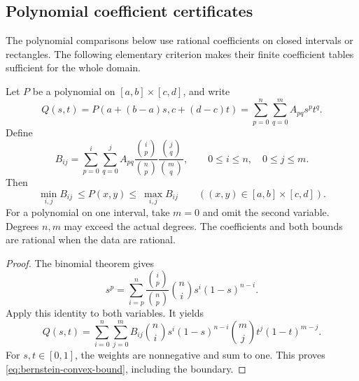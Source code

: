 \subsection{Polynomial coefficient certificates}
\label{sec:bernstein-certificates}

The polynomial comparisons below use rational coefficients on closed
intervals or rectangles. The following elementary criterion makes
their finite coefficient tables sufficient for the whole domain.

\begin{lemma}\label{lem:bernstein-certificate}
Let \(P\) be a polynomial on
\([a,b]\times[c,d]\), and write
\[
 Q(s,t)=P(a+(b-a)s,c+(d-c)t)
       =\sum_{p=0}^{n}\sum_{q=0}^{m}A_{pq}s^pt^q.
\]
Define
\begin{equation}\label{eq:bernstein-coefficients}
 B_{ij}=\sum_{p=0}^{i}\sum_{q=0}^{j}
 A_{pq}\frac{\binom{i}{p}}{\binom{n}{p}}
        \frac{\binom{j}{q}}{\binom{m}{q}},
 \qquad 0\le i\le n,\quad0\le j\le m.
\end{equation}
Then
\begin{equation}\label{eq:bernstein-convex-bound}
 \min_{i,j} B_{ij}\ \le P(x,y)\le\ \max_{i,j}B_{ij}
 \qquad ((x,y)\in[a,b]\times[c,d]).
\end{equation}
For a polynomial on one interval, take \(m=0\) and omit the
second variable. Degrees \(n,m\) may exceed the actual degrees.
The coefficients and both bounds are rational when the data are rational.
\end{lemma}
\begin{proof}
The binomial theorem gives
\[
 s^p=\sum_{i=p}^{n}
       \frac{\binom{i}{p}}{\binom{n}{p}}
       \binom{n}{i}s^i(1-s)^{n-i}.
\]
Apply this identity to both variables. It yields
\[
 Q(s,t)=\sum_{i=0}^{n}\sum_{j=0}^{m}B_{ij}
 \binom{n}{i}s^i(1-s)^{n-i}
 \binom{m}{j}t^j(1-t)^{m-j}.
\]
For \(s,t\in[0,1]\), the weights are nonnegative and sum to one.
This proves \eqref{eq:bernstein-convex-bound}, including the boundary.
\end{proof}

